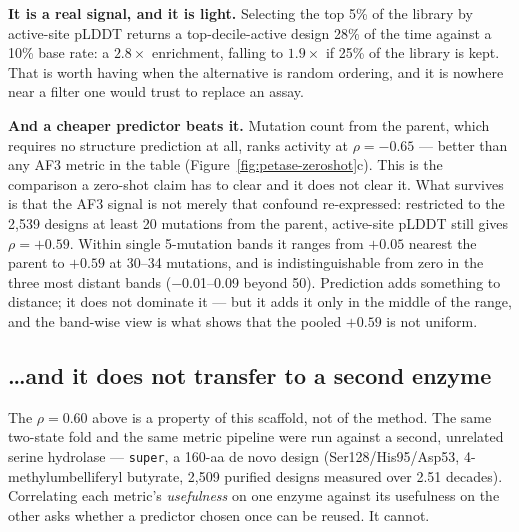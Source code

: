 \textbf{It is a real signal, and it is light.} Selecting the top 5\% of the
library by active-site pLDDT returns a top-decile-active design 28\% of the
time against a 10\% base rate: a $2.8\times$ enrichment, falling to $1.9\times$
if 25\% of the library is kept. That is worth having when the alternative is
random ordering, and it is nowhere near a filter one would trust to replace an
assay.

\textbf{And a cheaper predictor beats it.} Mutation count from the parent, which
requires no structure prediction at all, ranks activity at $\rho = -0.65$ ---
better than any AF3 metric in the table (Figure~\ref{fig:petase-zeroshot}c).
This is the comparison a zero-shot claim has to clear and it does not clear it.
What survives is that the AF3 signal is not merely that confound re-expressed:
restricted to the 2{,}539 designs at least 20 mutations from the parent, active-site
pLDDT still gives $\rho = +0.59$. Within single 5-mutation bands it ranges from
$+0.05$ nearest the parent to $+0.59$ at \numrange{30}{34} mutations, and is
indistinguishable from zero in the three most distant bands
(\numrange{-0.01}{+0.09} beyond 50). Prediction adds something to distance; it
does not dominate it --- but it adds it only in the middle of the range, and the
band-wise view is what shows that the pooled $+0.59$ is not uniform.

\subsection*{\dots and it does not transfer to a second enzyme}

The $\rho = 0.60$ above is a property of this scaffold, not of the method. The
same two-state fold and the same metric pipeline were run against a second,
unrelated serine hydrolase --- \texttt{super}, a 160-aa de novo design
(Ser128/His95/Asp53, 4-methylumbelliferyl butyrate, 2{,}509 purified designs
measured over 2.51 decades). Correlating each metric's \emph{usefulness} on one
enzyme against its usefulness on the other asks whether a predictor chosen once
can be reused. It cannot.

